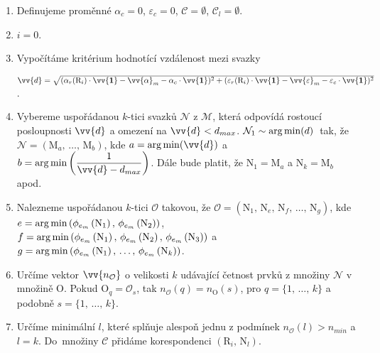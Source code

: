 \begin{enumerate}
\item Definujeme proměnné $\alpha_{c} = 0$, $\varepsilon_{c} = 0$, $\mathcal{C} = \emptyset$, $\mathcal{C}_{l} = \emptyset$.

\item $i = 0$.

\item Vypočítáme kritérium hodnotící vzdálenost mezi svazky 

$\vv{d} = \sqrt{(\alpha_{r}(\mathrm{R}_i)\cdot\vv{\mathbf{1}}-\vv{\alpha}_{m}-\alpha_{c}\cdot\vv{\mathbf{1}})^2 + (\varepsilon_{r}(\mathrm{R}_i)\cdot\vv{\mathbf{1}}-\vv{\varepsilon}_{m}-\varepsilon_{c}\cdot\vv{\mathbf{1}})^2}$.

\item Vybereme uspořádanou $k$-tici svazků $\mathcal{N}$ z $\mathcal{M}$, která odpovídá rostoucí posloupnosti $\vv{d}$ a omezení na $\vv{d} < d_{max}$. $\mathcal{N}_1 \sim \operatorname*{arg\,min}(d)\,$ tak, že $\mathcal{N} = \left(\mathrm{M}_a ,\,\dots,\, \mathrm{M}_b \right)$, kde $a = \argmin(\vv{d})$ a $b = \argmin\left(\dfrac{1}{\vv{d}-d_{max}}\right)$. Dále bude platit, že  $\mathrm{N}_1 = \mathrm{M}_a$ a $\mathrm{N}_k = \mathrm{M}_b$ apod. 

\item Nalezneme uspořádanou $k$-tici $\mathcal{O}$ takovou, že $\mathcal{O} = \left(\mathrm{N}_1 ,\,\mathrm{N}_e,\,\mathrm{N}_f ,\,\dots,\, \mathrm{N}_g \right)$, kde\\$e = \operatorname*{arg\,min}\left( \phi_{e_{m}}\left(\mathrm{N}_1 \right),\, \phi_{e_{m}}\left(\mathrm{N}_2 \right)  \right)$, $f = \operatorname*{arg\,min}\left( \phi_{e_{m}}\left(\mathrm{N}_1 \right),\, \phi_{e_{m}}\left(\mathrm{N}_2 \right),\, \phi_{e_{m}}\left(\mathrm{N}_3 \right)   \right)$ a \\  $g = \operatorname*{arg\,min}\left( \phi_{e_{m}}\left(\mathrm{N}_1 \right),\,\dots,\, \phi_{e_{m}}\left(\mathrm{N}_k \right)  \right)$.  

\item Určíme vektor $\vv{n_\mathcal{O}}$ o velikosti $k$ udávající četnost prvků z množiny $\mathcal{N}$ v množině $\mathrm{O}$. Pokud $\mathrm{O}_q = \mathcal{O}_s$, tak $n_{\mathcal{O}}(q) = n_{\mathrm{O}}(s)$, pro $q = \lbrace1,\,\dots,\,k \rbrace$ a podobně $s = \lbrace 1,\,\dots,\,k \rbrace$.

\item Určíme minimální $l$, které splňuje alespoň jednu z podmínek $n_{\mathcal{O}}(l) > n_{min}$  a $l = k$. Do~množiny $\mathcal{C}$ přidáme korespondenci $\left(\mathrm{R}_i,\,\mathrm{N}_l \right)$.


\end{enumerate}
